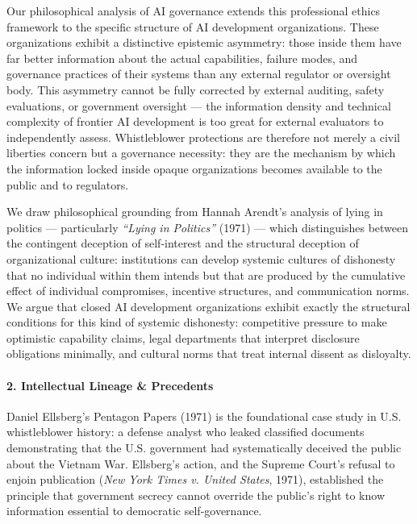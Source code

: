 Our philosophical analysis of AI governance extends this professional
ethics framework to the specific structure of AI development
organizations. These organizations exhibit a distinctive epistemic
asymmetry: those inside them have far better information about the
actual capabilities, failure modes, and governance practices of their
systems than any external regulator or oversight body. This asymmetry
cannot be fully corrected by external auditing, safety evaluations, or
government oversight --- the information density and technical
complexity of frontier AI development is too great for external
evaluators to independently assess. Whistleblower protections are
therefore not merely a civil liberties concern but a governance
necessity: they are the mechanism by which the information locked inside
opaque organizations becomes available to the public and to regulators.

We draw philosophical grounding from Hannah Arendt's analysis of lying
in politics --- particularly \emph{``Lying in Politics''} (1971) ---
which distinguishes between the contingent deception of self-interest
and the structural deception of organizational culture: institutions can
develop systemic cultures of dishonesty that no individual within them
intends but that are produced by the cumulative effect of individual
compromises, incentive structures, and communication norms. We argue
that closed AI development organizations exhibit exactly the structural
conditions for this kind of systemic dishonesty: competitive pressure to
make optimistic capability claims, legal departments that interpret
disclosure obligations minimally, and cultural norms that treat internal
dissent as disloyalty.

\paragraph{2. Intellectual Lineage \&
Precedents}\label{intellectual-lineage-precedents-7}

Daniel Ellsberg's Pentagon Papers (1971) is the foundational case study
in U.S. whistleblower history: a defense analyst who leaked classified
documents demonstrating that the U.S. government had systematically
deceived the public about the Vietnam War. Ellsberg's action, and the
Supreme Court's refusal to enjoin publication (\emph{New York Times v.
United States}, 1971), established the principle that government secrecy
cannot override the public's right to know information essential to
democratic self-governance.

